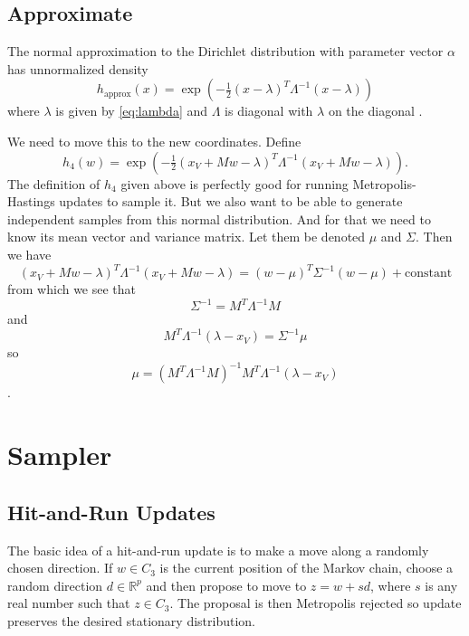 \documentclass[11pt]{article}
\newcommand{\real}{\mathbb{R}}
\begin{document}
\subsection{Approximate}

The normal approximation to the Dirichlet distribution with
parameter vector $\alpha$ has unnormalized density
$$
   h_{\text{approx}}(x)
   =
   \exp\left(- \tfrac{1}{2} (x - \lambda)^T \Lambda^{- 1} (x - \lambda) \right)
$$
where $\lambda$ is given by \eqref{eq:lambda} and $\Lambda$ is diagonal
with $\lambda$ on the diagonal \citep[Theorem~4.2]{geyer-meeden}.

We need to move this to the new coordinates.  Define
\begin{equation} \label{eq:h-approx-new}
   h_4(w)
   =
   \exp\left(- \tfrac{1}{2} (x_V + M w - \lambda)^T
   \Lambda^{- 1} (x_V + M w - \lambda) \right).
\end{equation}
The definition of $h_4$ given above is perfectly good for running
Metropolis-Hastings updates to sample it.  But we also want to
be able to generate independent samples from this normal distribution.
And for that we need to know its mean vector and variance matrix.
Let them be denoted $\mu$ and $\Sigma$.  Then we have
$$
   (x_V + M w - \lambda)^T \Lambda^{- 1} (x_V + M w - \lambda)
   =
   (w - \mu)^T \Sigma^{- 1} (w - \mu) + \text{constant}
$$
from which we see that
\begin{equation} \label{eq:h-approx-new-variance}
   \Sigma^{- 1} = M^T \Lambda^{- 1} M
\end{equation}
and
$$
   M^T \Lambda^{- 1} (\lambda - x_V) = \Sigma^{- 1} \mu
$$
so
\begin{equation} \label{eq:h-approx-new-mean}
   \mu = \left( M^T \Lambda^{- 1} M \right)^{- 1}
   M^T \Lambda^{- 1} (\lambda - x_V)
\end{equation}
\citep[compare equation (25) in][]{geyer-meeden}.

\section{Sampler}

\subsection{Hit-and-Run Updates}

The basic idea of a hit-and-run update is to make a move along a randomly
chosen direction.    If $w \in C_3$ is the current position of the Markov
chain, choose a random direction $d \in \real^p$ and then propose to move
to $z = w + s d$, where $s$ is any real number such that $z \in C_3$.
The proposal is then Metropolis rejected so update preserves the desired
stationary distribution.
\end{document}
